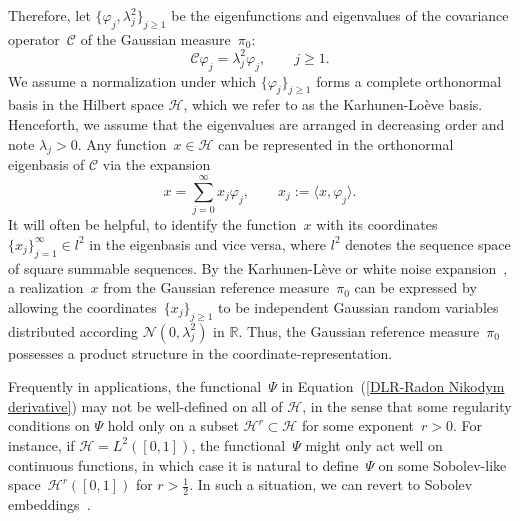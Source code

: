 Therefore, let $\{ \varphi_j, \lambda_j^2 \}_{j \geq 1}$ be the eigenfunctions and eigenvalues of the covariance operator~$\mathcal{C}$ of the Gaussian measure~$\pi_0$:
\begin{equation}
\label{DLR-Setting: Eigefunctions}
 \mathcal{C} \varphi_j = \lambda_j^2 \varphi_j, \qquad j \geq 1. 
\end{equation}
We assume a normalization under which $\{ \varphi_j \}_{j \geq 1}$ forms a complete orthonormal basis in the Hilbert space $\mathcal{H}$, which we refer to as the Karhunen-Lo\`{e}ve basis. Henceforth, we assume that the eigenvalues are arranged in decreasing order and note $\lambda_j > 0$. Any function~$x \in \mathcal{H}$ can be represented in the orthonormal eigenbasis of $\mathcal{C}$ via the expansion
\begin{equation}
\label{DLR-Setting: karhunen-loeve representation}
 x = \sum_{j = 0}^{\infty} x_j \varphi_j, \qquad x_j := \langle x, \varphi_j \rangle.
\end{equation}
It will often be helpful, to identify the function~$x$ with its coordinates~$\{ x_j \}_{j=1}^{\infty} \in l^2$ in the eigenbasis and vice versa, where $l^2$ denotes the sequence space of square summable sequences. By the Karhunen-L\`{e}ve or white noise expansion~\autocite[Section 2.2.3]{DaPrato1992}, a realization~$x$ from the Gaussian reference measure~$\pi_0$ can be expressed by allowing the coordinates~$\{x_j\}_{j \geq 1}$ to be independent Gaussian random variables distributed according $\mathcal{N}(0, \lambda_j^2)$ in $\mathbb{R}$. Thus, the Gaussian reference measure~$\pi_0$ possesses a product structure in the coordinate-representation.


Frequently in applications, the functional~$\Psi$ in Equation~(\ref{DLR-Radon Nikodym derivative}) may not be well-defined on all of $\mathcal{H}$, in the sense that some regularity conditions on $\Psi$ hold only on a subset $\mathcal{H}^r \subset \mathcal{H}$ for some exponent~$r > 0$. For instance, if $ \mathcal{H}= L^2([0,1]) $, the functional~$\Psi$ might only act well on continuous functions, in which case it is natural to define~$\Psi$ on some Sobolev-like space~$\mathcal{H}^r([0,1])$ for $r > \tfrac{1}{2}$. In such a situation, we can revert to  Sobolev embeddings~\autocite[Theorem 6.3]{Hairer2009}.


